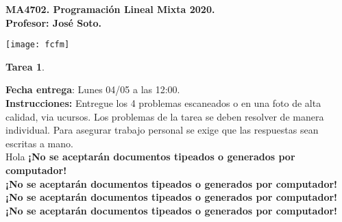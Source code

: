 \documentclass{article}
\theoremstyle{plain}
\theoremstyle{definition}
\theoremstyle{Azul}
\begin{document}
\setlength{\headheight}{14pt}
\vspace*{-1.2 cm}
\begin{minipage}{0.6\textwidth}
	\begin{flushleft}
		\hspace*{-0.5cm}\textbf{MA4702. Programación Lineal Mixta 2020.}\\
		\hspace*{-0.5cm}\textbf{Profesor: José Soto.}\\
	\end{flushleft}
\end{minipage}
\begin{minipage}{0.36\textwidth}
	\begin{flushright}
		\texttt{[image: fcfm]}
	\end{flushright}
\end{minipage}
\bigskip

\newif\ifsol
\soltrue
\solfalse

\begin{center}
  \LARGE \textbf{Tarea 1}.\\
\end{center}
\bigskip

\noindent\textbf{Fecha entrega}: Lunes 04/05 a las 12:00.\\
\textbf{Instrucciones:} Entregue los 4 problemas escaneados o en una foto de alta calidad, via ucursos.
Los problemas de la tarea se deben resolver de manera individual. Para asegurar trabajo personal se exige que las respuestas sean escritas a mano.\\

Hola
\noindent \textbf{¡No se aceptarán documentos tipeados o generados por computador!}\\
\textbf{¡No se aceptarán documentos tipeados o generados por computador!}\\
\textbf{¡No se aceptarán documentos tipeados o generados por computador!}\\
\textbf{¡No se aceptarán documentos tipeados o generados por computador!}\\
\end{document}
